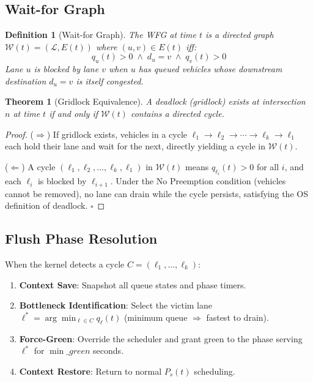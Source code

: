\documentclass[11pt]{article}
\newtheorem{theorem}{Theorem}
\newtheorem{definition}{Definition}
\begin{document}
\subsection{Wait-for Graph}

\begin{definition}[Wait-for Graph]
The WFG at time $t$ is a directed graph $\mathcal{W}(t) = (\mathcal{L}, E(t))$ where
$(u, v) \in E(t)$ iff:
\[
  q_u(t) > 0 \;\land\; d_u = v \;\land\; q_v(t) > 0
\]
Lane $u$ is blocked by lane $v$ when $u$ has queued vehicles whose downstream
destination $d_u = v$ is itself congested.
\end{definition}

\begin{theorem}[Gridlock Equivalence]
A deadlock (gridlock) exists at intersection $n$ at time $t$ if and only if
$\mathcal{W}(t)$ contains a directed cycle.
\end{theorem}

\begin{proof}
($\Rightarrow$) If gridlock exists, vehicles in a cycle $\ell_1 \to \ell_2 \to
\cdots \to \ell_k \to \ell_1$ each hold their lane and wait for the next, directly
yielding a cycle in $\mathcal{W}(t)$.

($\Leftarrow$) A cycle $(\ell_1, \ell_2, \ldots, \ell_k, \ell_1)$ in $\mathcal{W}(t)$
means $q_{\ell_i}(t) > 0$ for all $i$, and each $\ell_i$ is blocked by $\ell_{i+1}$.
Under the No Preemption condition (vehicles cannot be removed), no lane can drain
while the cycle persists, satisfying the OS definition of deadlock. \qquad $\square$
\end{proof}

\subsection{Flush Phase Resolution}

When the kernel detects a cycle $C = (\ell_1, \ldots, \ell_k)$:

\begin{enumerate}
  \item \textbf{Context Save}: Snapshot all queue states and phase timers.
  \item \textbf{Bottleneck Identification}: Select the victim lane
        $\ell^* = \arg\min_{\ell \in C} q_\ell(t)$ (minimum queue $\Rightarrow$
        fastest to drain).
  \item \textbf{Force-Green}: Override the scheduler and grant green to the
        phase serving $\ell^*$ for $\min\_green$ seconds.
  \item \textbf{Context Restore}: Return to normal $P_s(t)$ scheduling.
\end{enumerate}
\end{document}
